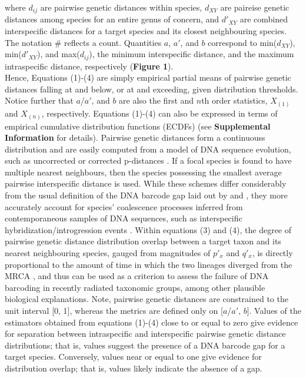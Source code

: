 \documentclass[12pt]{article}
\begin{document}
\noindent where $d_{ij}$ are pairwise genetic distances within species, $d_{XY}$ are paireise genetic distances among species for an entire genus of concern, and $d'_{XY}$ are combined interspecific distances for a target species and its closest neighbouring species. The notation \# reflects a count.  Quantities $a$, $a'$, and $b$ correspond to min($d_{XY}$), min($d'_{XY}$), and max($d_{ij}$), the minimum interspecific distance, and the maximum intraspecific distance, respectively (\textbf{Figure 1}). \\ Hence, Equations (1)-(4) are simply empirical partial means of pairwise genetic distances falling at and below, or at and exceeding, given distribution thresholds. Notice further that $a$/$a'$, and $b$ are also the first and $n$th order statistics, $X_{(1)}$ and $X_{(n)}$, respectively. Equations (1)-(4) can also be expressed in terms of empirical cumulative distribution functions (ECDFs) (see \textbf{Supplemental Information} for details). Pairwise genetic distances form a continuouss distribution and are easily computed from a model of DNA sequence evolution, such as uncorrected or corrected p-distances \citep{jukes1969evolution, kimura1980simple}. If a focal species is found to have multiple nearest neighbours, then the species possessing the smallest average pairwise interspecific distance is used. While these schemes differ considerably from the usual definition of the DNA barcode gap laid out by \citet{meyer2005dna} and \citet{meier2008use}, they more accurately account for species' coalescence processes inferred from contemporaneous samples of DNA sequences, such as interspecific hybridization/introgression events \citep{phillips2024measure}. Within equations (3) and (4), the degree of pairwise genetic distance distribution overlap between a target taxon and its nearest neighbouring species, gauged from magnitudes of $p'_x$ and $q'_x$, is directly proportional to the amount of time in which the two lineages diverged from the MRCA \citep{phillips2024measure}, and thus can be used as a criterion to assess the failure of DNA barcoding in recently radiated taxonomic groups, among other plausible biological explanations.  Note, pairwise genetic distances are constrained to the unit interval [0, 1], whereas the metrics are defined only on [$a$/$a'$, $b$]. Values of the estimators obtained from equations (1)-(4) close to or equal to zero give evidence for separation between intraspecific and interspecific pairwise genetic distance distributions; that is, values suggest the presence of a DNA barcode gap for a target species. Conversely, values near or equal to one give evidence for distribution overlap; that is, values likely indicate the absence of a gap. 
\end{document}
